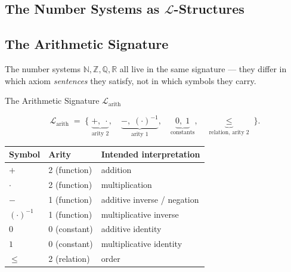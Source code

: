 %

\subsection{\texorpdfstring{The Number Systems as $\mathcal{L}$-Structures}{The Number Systems as L-Structures}}
\label{sec:number-systems-as-structures}

\subsection*{The Arithmetic Signature}

The number systems $\mathbb{N}, \mathbb{Z}, \mathbb{Q}, \mathbb{R}$
all live in the same signature --- they differ in which axiom
\emph{sentences} they satisfy, not in which symbols they carry.

\begin{axiombox}{The Arithmetic Signature $\mathcal{L}_{\mathrm{arith}}$}

\[
\mathcal{L}_{\mathrm{arith}}
\;=\;
\bigl\{\;
  \underbrace{+,\;\cdot}_{\text{arity 2}},\quad
  \underbrace{-,\;(\cdot)^{-1}}_{\text{arity 1}},\quad
  \underbrace{0,\;1}_{\text{constants}},\quad
  \underbrace{{\leq}}_{\text{relation, arity 2}}
\;\bigr\}.
\]

\medskip
\begin{tabular}{@{} l l l @{}}
\toprule
\textbf{Symbol} & \textbf{Arity} & \textbf{Intended interpretation} \\
\midrule
$+$        & 2 (function) & addition \\
$\cdot$    & 2 (function) & multiplication \\
$-$        & 1 (function) & additive inverse / negation \\
$(\cdot)^{-1}$ & 1 (function) & multiplicative inverse \\
$0$        & 0 (constant) & additive identity \\
$1$        & 0 (constant) & multiplicative identity \\
${\leq}$   & 2 (relation) & order \\
\bottomrule
\end{tabular}
\end{axiombox}

